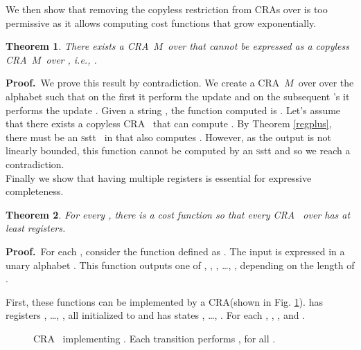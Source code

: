 \documentclass[11pt]{article}
\newtheorem{theorem}{Theorem}
\def\Proof{{\bf Proof.}}
\def\qed{{\bf }}
\newcommand{\Fig}[1]{Fig. #1}
\def\qed{{\bf }}
\newcommand{\SSTT}{{\sc\textsc sstt}\xspace}
\newcommand{\EDWA}{{CRA}\xspace}
\newcommand{\edwa}{\ensuremath{M}}
\newcommand{\ie}{{\em i.e.}\xspace}
\begin{document}
We then show that removing the copyless restriction from CRAs over
 is too permissive as it allows computing cost
functions that grow exponentially.

\begin{theorem}
\label{mvcmtomvcmr}
There exists a \EDWA~\edwa~over  that cannot be
expressed as a copyless \EDWA~\edwa~over , \ie,
.
\end{theorem}

\Proof~We prove this result by contradiction.  We create a
\EDWA~\edwa~over  over the alphabet  such
that on the first  it perform the update  and on the
subsequent 's it performs the update . Given a string , the function computed is .  Let's assume that there
exists a copyless \EDWA~ that can compute .  By Theorem
\ref{regplus}, there must be an \SSTT~ in  that also computes .  However, as the output is not linearly
bounded, this function cannot be computed by an \SSTT and so we reach
a contradiction.  \qed \\

Finally we show that having multiple registers is essential for
expressive completeness.

\begin{theorem}\label{kvar}
For every , there is a cost function  so that every
\EDWA~ over  has at least  registers.
\end{theorem}

\Proof~For each , consider the function
 defined as
.  The input  is
expressed in a unary alphabet .  This function
outputs one of , , , \ldots{}, , depending on the
length of .

First, these functions can be implemented by a \EDWA  (shown
in \Fig \ref{fig:k-var-reqd:MRAA:M_k}).   has  registers
, \ldots{}, , all initialized to  and has  states
, \ldots{}, .  For each , , , and .

\begin{figure}
\begin{centering}
\par\end{centering}

\caption{\label{fig:k-var-reqd:MRAA:M_k}\EDWA~  implementing .
Each transition performs , for all .}
\end{figure}
\end{document}

